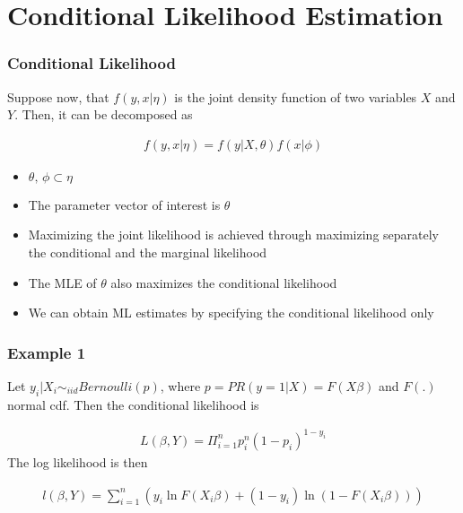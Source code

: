 \documentclass[
  shownotes,
  xcolor={svgnames},
  hyperref={colorlinks,citecolor=DarkBlue,linkcolor=DarkRed,urlcolor=DarkBlue}
  ]{beamer}
\begin{document}
\section{Conditional Likelihood Estimation}
\begin{frame}[fragile]
\frametitle{Conditional Likelihood }

Suppose now, that $f(y,x|\eta)$ is the joint density function of two variables $X$ and $Y$.  Then, it can be decomposed as

\begin{align}
f(y,x|\eta) =f(y|X,\theta)f(x|\phi)
\end{align}

\begin{itemize}
  \item $\theta,\,\phi \subset \eta$ 
  \medskip
  \item The parameter vector of interest is  $\theta$
  \medskip
  \item Maximizing the joint likelihood is achieved through maximizing separately the conditional and the marginal likelihood
  \medskip
  \item The MLE of $\theta$ also maximizes the conditional likelihood  
  \medskip
  \item We can obtain ML estimates by specifying the conditional likelihood only
\end{itemize}  

 
\end{frame}
\begin{frame}[fragile]
\frametitle{Example 1}

Let $y_i|X_i \sim_{iid} Bernoulli(p)$, where $p=PR(y=1|X)=F(X\beta)$ and $F(.)$ normal cdf. Then the conditional likelihood is

\begin{align}
L(\beta,Y)=\Pi_{i=1}^n p_i^n(1-p_i)^{1-y_i}
\end{align}
The log likelihood is then

\begin{align}
l(\beta,Y)=\sum_{i=1}^n\left(y_i \ln F(X_i\beta)+(1-y_i)\ln(1-F(X_i\beta))\right)
\end{align}

\end{frame}
\end{document}
